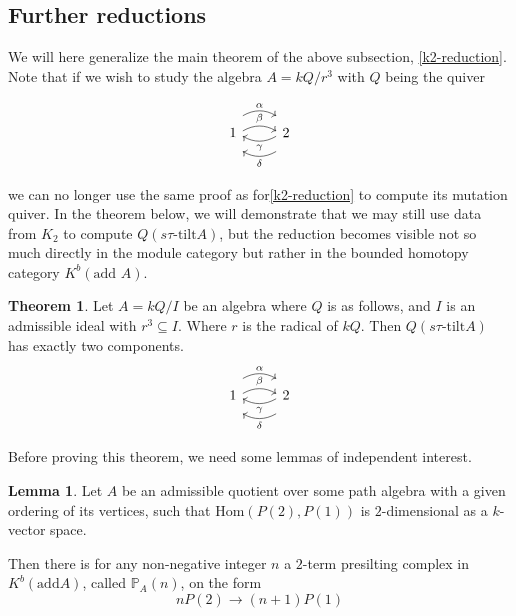\documentclass[]{article}
\theoremstyle{definition}
\newtheorem{theorem}{Theorem}[section]
\newtheorem{lemma}{Lemma}[section]
\newcommand{\tu}{\ensuremath{\tau}}
\begin{document}
\subsection{Further reductions}
We will here generalize the main theorem of the above subsection, \cref{k2-reduction}. Note that if we wish to study the algebra $A = kQ/r^3$ with $Q$ being the quiver

\[\begin{tikzcd}
	1 
	\arrow[r,bend left,shift right = 0.5ex, "\beta"]
	\arrow[r,bend left, shift left = 2ex, "\alpha"]
	& 2 \arrow[l,bend left,shift right = 0.5ex,"\gamma"]
	\arrow[l,bend left,shift left = 2ex, "\delta"]  \\
\end{tikzcd}
\]

we can no longer use the same proof as for\cref{k2-reduction} to compute its mutation quiver. In the theorem below, we will demonstrate that we may still use data from $K_2$ to compute $Q(s\tu\text{-tilt} A)$, but the reduction becomes visible not so much directly in the module category but rather in the bounded homotopy category $K^b(\text{add } A)$.

\begin{theorem}
	Let $A = kQ/I$ be an algebra where $Q$ is as follows, and $I$ is an admissible ideal with $r^3 \subseteq I$. Where $r$ is the radical of $kQ$. Then $Q(s\tu\text{-tilt} A)$ has exactly two components.
\[\begin{tikzcd}
	1 
	\arrow[r,bend left,shift right = 0.5ex, "\beta"]
	\arrow[r,bend left, shift left = 2ex, "\alpha"]
	& 2 \arrow[l,bend left,shift right = 0.5ex,"\gamma"]
	\arrow[l,bend left,shift left = 2ex, "\delta"]  \\
\end{tikzcd}
\]
\end{theorem}

Before proving this theorem, we need some lemmas of independent interest.

\begin{lemma}\label{2term-reduction}
	Let $A$ be an admissible quotient over some path algebra with a given ordering of its vertices, such that $\text{Hom}(P(2),P(1))$ is $2$-dimensional as a $k$-vector space.
	
	Then there is for any non-negative integer $n$ a $2$-term presilting complex in $K^b(\text{add} A)$, called $\mathbb{P}_A(n)$, on the form \[nP(2) \to (n+1)P(1)\]

\end{lemma}
\end{document}
